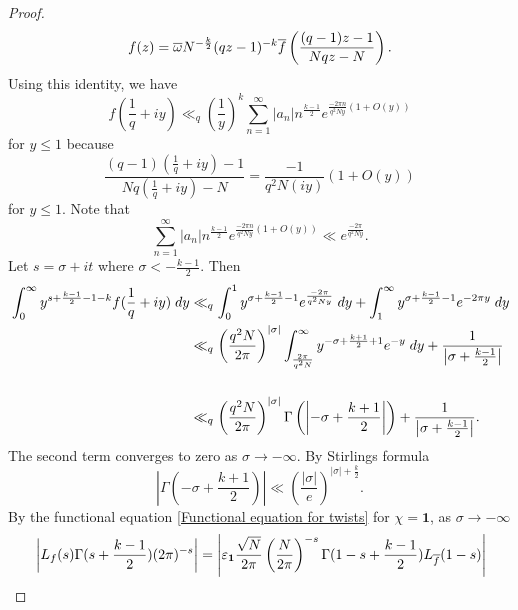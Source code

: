 \documentclass[a4paper,12.5pt]{amsart}
\theoremstyle{definition}
\theoremstyle{remark}
\newcommand{\F}{L_f}
\begin{document}
\begin{proof}
\begin{equation*}{\label{modular relation for f}}
    f(z)=   \overline{\omega} N^{ - \frac{k}{2}} (qz-1)^{-k} \overline{f} \left( \frac{(q-1)z -1}{ Nqz-N}     \right)         .  
\end{equation*}   
 Using this identity, we have
\[ f(\frac{1}{q}+iy)  \ll_{q}  \left(\frac{1}{y}\right)^{k} \sum_{n=1}^{\infty} |a_n| n^{\frac{k-1}{2}} e^{         \frac{ - 2 \pi n} {  q^2 N y} \left( 1+ O(y) \right)  }   \]
for $y \leq 1$  because 
\[      \frac{(q-1) ( \frac{1}{q} +iy)  -1}{ Nq ( \frac{1}{q} +iy  )-N} = \frac{-1}{ q^2 N (iy)} \left( 1 + O(y) \right)              \] 
for $y \leq 1$. Note that 
\[       \sum_{n=1}^{\infty} |a_n| n^{ \frac{k-1}{2}} e^{     \frac{ - 2 \pi n} {  q^2 N y} \left( 1 +O(y) \right)   } \ll     e^{ \frac{ -  2 \pi }{ q^2 N y}   }    .        \]
 Let $s= \sigma+it$ where $\sigma< -\frac{k-1}{2}$. Then 
\begin{align}{\label{integral estimate for f}}
    \int_{0}^{\infty} y^{s+\frac{k-1}{2}-1-k}  f(\frac{1}{q}+iy)  \; dy & \ll_{q}   \int_{0}^{1} y^{\sigma + \frac{k-1}{2} -1  }   e^{ \frac{ - 2 \pi  }{q^2 N y}   } \; dy + \int_{1}^{\infty}   y^{\sigma + \frac{k-1}{2} -1 } e^{- 2  \pi y} \; dy  \nonumber \\
        & \ll_q   \left( \frac{q^2 N}{ 2 \pi}  \right)^{| \sigma|}  \int_{\frac{2 \pi}{q^2 N}}^{\infty} y^{ -\sigma + \frac{k+1}{2} +1} e^{-y} \; dy                      +   \frac{ 1  }{ \left| \sigma + \frac{k-1}{2} \right|}   \nonumber \\ 
                                     \\& \ll_q  \left( \frac{q^2 N}{ 2  \pi}  \right)^{| \sigma|} \Gamma\left( \left| - \sigma + \frac{k+1}{2} \right| \right)     +    \frac{ 1  }{ \left| \sigma + \frac{k-1}{2} \right|}  \nonumber . \end{align} 
 The second term converges to zero as $\sigma \rightarrow -\infty$.
 By Stirlings formula 
 \[ \left| \Gamma(- \sigma + \frac{k+1}{2}) \right| \ll %
 \left( \frac{|\sigma|}{e} \right)^{|\sigma| +\frac{k}{2}}    .\] 
     By the functional equation \eqref{Functional equation for twists} for $\chi= \mathbf{1}$,  as $\sigma \rightarrow -\infty$
     \begin{align}{\label{numerator of additive twist}}  \left| \F(s) \Gamma(s+\frac{k-1}{2}) (2 \pi)^{-s} \right| &= \left| \varepsilon_{\bold{1}} \frac{\sqrt{N}}{ 2 \pi} \left( \frac{N}{2\pi}  \right)^{-s}  \Gamma(1-s +\frac{k-1}{2}) L_{\overline{f}}(1 - s)  \right| \nonumber \\

\end{align}
\end{proof}
\end{document}
